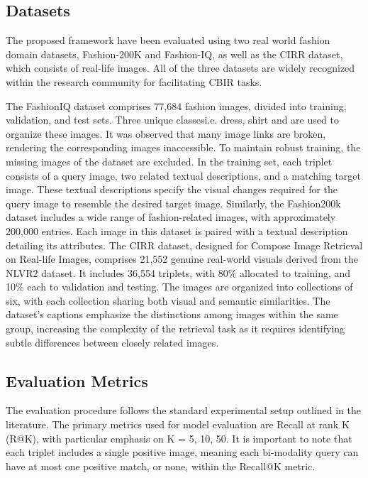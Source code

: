 \documentclass[10pt,lineno]{wlpeerj}
\begin{document}
\subsection*{Datasets}
The proposed framework have been evaluated using two real world fashion domain datasets, Fashion-200K and Fashion-IQ, as well as the CIRR dataset, which consists of real-life images. All of the three datasets are widely recognized within the research community for facilitating CBIR tasks.

The FashionIQ dataset comprises 77,684 fashion images, divided into training, validation, and test sets. Three unique classesi.e. dress, shirt and are used to organize these images. It was observed that many image links are broken, rendering the corresponding images inaccessible. To maintain robust training, the missing images of the dataset are excluded. In the training set, each triplet consists of a query image, two related textual descriptions, and a matching target image. These textual descriptions specify the visual changes required for the query image to resemble the desired target image. Similarly, the Fashion200k dataset includes a wide range of fashion-related images, with approximately 200,000 entries. Each image in this dataset is paired with a textual description detailing its attributes. The CIRR dataset, designed for Compose Image Retrieval on Real-life Images, comprises 21,552 genuine real-world visuals derived from the NLVR2 \cite{CIRPLANT} dataset. It includes 36,554 triplets, with 80\% allocated to training, and 10\% each to validation and testing. The images are organized into collections of six, with each collection sharing both visual and semantic similarities. The dataset's captions emphasize the distinctions among images within the same group, increasing the complexity of the retrieval task as it requires identifying subtle differences between closely related images.

\subsection*{Evaluation Metrics}
\par The evaluation procedure follows the standard experimental setup outlined in the literature. The primary metrics used for model evaluation are Recall at rank K (R@K), with particular emphasis on K = {5, 10, 50}. It is important to note that each triplet includes a single positive image, meaning each bi-modality query can have at most one positive match, or none, within the Recall@K metric.
\end{document}
